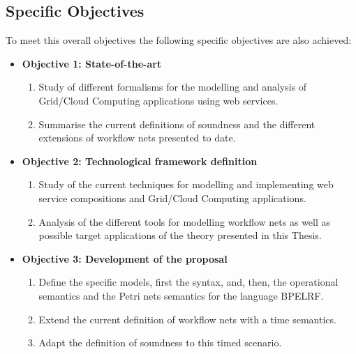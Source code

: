 \subsection*{Specific Objectives}

To meet this overall objectives the following specific objectives are also achieved:

\begin{itemize}

\item \textbf {Objective 1: State-of-the-art}

\begin{enumerate}

\item Study of different formalisms for the modelling and analysis of Grid/Cloud Computing applications using web services.

\item Summarise the current definitions of soundness and the different extensions of workflow nets presented to date.

\end{enumerate}

\item \textbf{Objective 2: Technological framework definition}

\begin{enumerate}

\item Study of the current techniques for modelling and implementing web service compositions and Grid/Cloud Computing applications.

\item Analysis of the different tools for modelling workflow nets as well as possible target applications of the theory presented in this Thesis.
\end{enumerate}

\item \textbf{Objective 3: Development of the proposal}

\begin{enumerate}

\item Define the specific models, first the syntax, and, then, the operational semantics and the Petri nets semantics for the language BPELRF.

\item Extend the current definition of workflow nets with a time semantics.

\item Adapt the definition of soundness to this timed scenario.


\end{enumerate}
\end{itemize}
